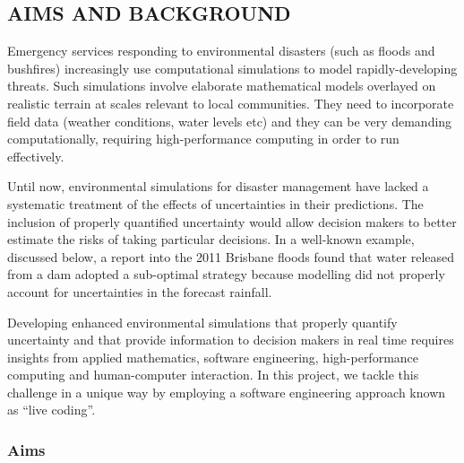 \subsection*{AIMS AND BACKGROUND}

Emergency services responding to environmental disasters (such as
floods and bushfires) increasingly use computational simulations
to model rapidly-developing threats. Such simulations involve elaborate mathematical models
overlayed on realistic terrain at scales relevant to local
communities. They need to incorporate field data (weather conditions,
water levels etc) and they can be very demanding computationally,
requiring high-performance computing in order to run effectively.

Until now, environmental simulations for disaster management have lacked a systematic treatment of the effects of uncertainties in their predictions. The inclusion of properly quantified uncertainty would allow decision makers to better estimate the risks of taking particular decisions. In a well-known example, discussed below, a report into the 2011 Brisbane floods found that water released from a dam adopted a sub-optimal strategy because modelling did not properly account for uncertainties in the forecast rainfall.

Developing enhanced environmental simulations that properly quantify uncertainty and that provide information to decision makers in real time requires insights from applied mathematics, software engineering, high-performance computing and human-computer interaction. In this project, we tackle this challenge in a unique way by employing a software engineering approach  known as ``live coding''. 



\subsubsection*{Aims}

